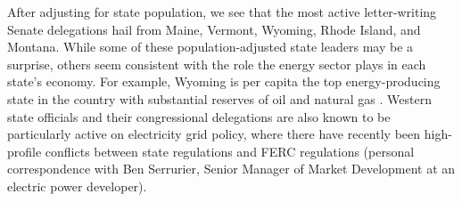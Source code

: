 \documentclass{article}
\begin{document}
After adjusting for state population, we see that the most active letter-writing Senate delegations hail from Maine, Vermont, Wyoming, Rhode Island, and Montana.  While some of these population-adjusted state leaders may be a surprise, others seem consistent with the role the energy sector plays in each state's economy.  For example, Wyoming is per capita the top energy-producing state in the country with substantial reserves of oil and natural gas \citep{Wyoming2019}. Western state officials and their congressional delegations are also known to be particularly active on electricity grid policy, where there have recently been high-profile conflicts between state regulations and FERC regulations (personal correspondence with Ben Serrurier, Senior Manager of Market Development at an electric power developer). 



\end{document}
